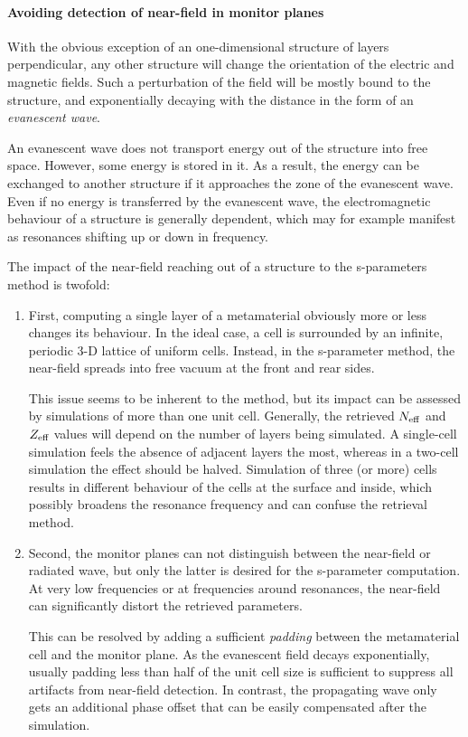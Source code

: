 \paragraph{Avoiding detection of near-field in monitor planes} %
With the obvious exception of an one-dimensional structure of layers perpendicular, any other structure will change the orientation of the electric and magnetic fields. Such a perturbation of the field will be mostly bound to the structure, and exponentially decaying with the distance in the form of an \textit{evanescent wave}.

An evanescent wave does not transport energy out of the structure into free space. However, some energy is stored in it. As a result, the energy can be exchanged to another structure if it approaches the zone of the evanescent wave. Even if no energy is transferred by the evanescent wave, the electromagnetic behaviour of a structure is generally dependent, which may for example manifest as resonances shifting up or down in frequency.

The impact of the near-field reaching out of a structure to the s-parameters method is twofold:
\begin{enumerate}
 \item{First, computing a single layer of a metamaterial obviously more or less changes its behaviour. In the ideal case, a cell is surrounded by an infinite, periodic 3-D lattice of uniform cells.  Instead, in the s-parameter method, the near-field spreads into free vacuum at the front and rear sides. 

This issue seems to be inherent to the method, but its impact can be assessed by simulations of more than one unit cell. Generally, the retrieved $N_{\text{eff} }$ and $Z_{\text{eff} }$ values will depend on the number of layers being simulated. A single-cell simulation feels the absence of adjacent layers the most, whereas in a two-cell simulation the effect should be halved. Simulation of three (or more) cells results in different behaviour of the cells at the surface and inside, which possibly broadens the resonance frequency and can confuse the retrieval method.
 } 
 \item{Second, the monitor planes can not distinguish between the near-field or radiated wave, but only the latter is desired for the s-parameter computation. At very low frequencies or at frequencies around resonances, the near-field can significantly distort the retrieved parameters.

This can be resolved by adding a sufficient \textit{padding} between the metamaterial cell and the monitor plane. As the evanescent field decays exponentially, usually padding less than half of the unit cell size is sufficient to suppress all artifacts from near-field detection. In contrast, the propagating wave only gets an additional phase offset that can be easily compensated after the simulation. } 
 \end{enumerate}

